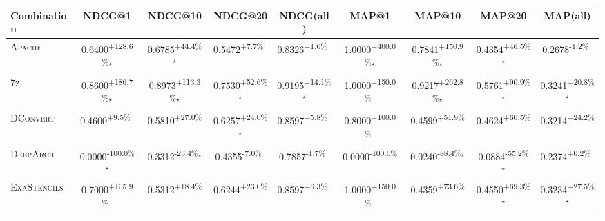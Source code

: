\begin{table}[htbp]
\centering
\renewcommand{\arraystretch}{1.2}
\begin{tabular}{l|cccc|cccc}
\hline
Combination & NDCG@1 & NDCG@10 & NDCG@20 & NDCG(all) & MAP@1 & MAP@10 & MAP@20 & MAP(all) \\ \hline
\textsc{Apache} & \cellcolor{green!30}0.6400\textsuperscript{+128.6\%}$^\star$ & \cellcolor{green!30}0.6785\textsuperscript{+44.4\%}$^\star$ & \cellcolor{green!30}0.5472\textsuperscript{+7.7\%}$^{\,\,\,}$ & \cellcolor{green!30}0.8326\textsuperscript{+1.6\%}$^{\,\,\,}$ & \cellcolor{green!30}1.0000\textsuperscript{+400.0\%}$^\star$ & \cellcolor{green!30}0.7841\textsuperscript{+150.9\%}$^\star$ & \cellcolor{green!30}0.4354\textsuperscript{+46.5\%}$^\star$ & \cellcolor{red!30}0.2678\textsuperscript{-1.2\%}$^{\,\,\,}$ \\
\textsc{7z} & \cellcolor{green!30}0.8600\textsuperscript{+186.7\%}$^\star$ & \cellcolor{green!30}0.8973\textsuperscript{+113.3\%}$^\star$ & \cellcolor{green!30}0.7530\textsuperscript{+52.6\%}$^\star$ & \cellcolor{green!30}0.9195\textsuperscript{+14.1\%}$^\star$ & \cellcolor{green!30}1.0000\textsuperscript{+150.0\%}$^{\,\,\,}$ & \cellcolor{green!30}0.9217\textsuperscript{+262.8\%}$^\star$ & \cellcolor{green!30}0.5761\textsuperscript{+90.9\%}$^\star$ & \cellcolor{green!30}0.3241\textsuperscript{+20.8\%}$^\star$ \\
\textsc{DConvert} & \cellcolor{green!30}0.4600\textsuperscript{+9.5\%}$^{\,\,\,}$ & \cellcolor{green!30}0.5810\textsuperscript{+27.0\%}$^{\,\,\,}$ & \cellcolor{green!30}0.6257\textsuperscript{+24.0\%}$^\star$ & \cellcolor{green!30}0.8597\textsuperscript{+5.8\%}$^{\,\,\,}$ & \cellcolor{green!30}0.8000\textsuperscript{+100.0\%}$^{\,\,\,}$ & \cellcolor{green!30}0.4599\textsuperscript{+51.9\%}$^{\,\,\,}$ & \cellcolor{green!30}0.4624\textsuperscript{+60.5\%}$^{\,\,\,}$ & \cellcolor{green!30}0.3214\textsuperscript{+24.2\%}$^{\,\,\,}$ \\
\textsc{DeepArch} & \cellcolor{red!30}0.0000\textsuperscript{-100.0\%}$^\star$ & \cellcolor{red!30}0.3312\textsuperscript{-23.4\%}$^\star$ & \cellcolor{red!30}0.4355\textsuperscript{-7.0\%}$^{\,\,\,}$ & \cellcolor{red!30}0.7857\textsuperscript{-1.7\%}$^{\,\,\,}$ & \cellcolor{red!30}0.0000\textsuperscript{-100.0\%}$^{\,\,\,}$ & \cellcolor{red!30}0.0240\textsuperscript{-88.4\%}$^\star$ & \cellcolor{red!30}0.0884\textsuperscript{-55.2\%}$^\star$ & \cellcolor{green!30}0.2374\textsuperscript{+0.2\%}$^{\,\,\,}$ \\
\textsc{ExaStencils} & \cellcolor{green!30}0.7000\textsuperscript{+105.9\%}$^{\,\,\,}$ & \cellcolor{green!30}0.5312\textsuperscript{+18.4\%}$^{\,\,\,}$ & \cellcolor{green!30}0.6244\textsuperscript{+23.0\%}$^{\,\,\,}$ & \cellcolor{green!30}0.8597\textsuperscript{+6.3\%}$^{\,\,\,}$ & \cellcolor{green!30}1.0000\textsuperscript{+150.0\%}$^{\,\,\,}$ & \cellcolor{green!30}0.4359\textsuperscript{+73.6\%}$^{\,\,\,}$ & \cellcolor{green!30}0.4550\textsuperscript{+69.3\%}$^\star$ & \cellcolor{green!30}0.3234\textsuperscript{+27.5\%}$^\star$ \\

\end{tabular}
\end{table}
